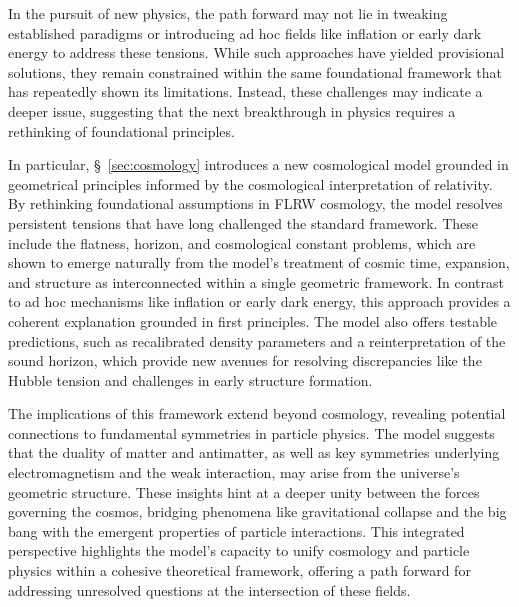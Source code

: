 \documentclass[aps,rmp,groupedaddress,twocolumn,10pt]{revtex4-2}
\begin{document}
In the pursuit of new physics, the path forward may not lie in tweaking established paradigms or introducing ad hoc fields like inflation or early dark energy \cite{Kamionkowski2023} to address these tensions. While such approaches have yielded provisional solutions, they remain constrained within the same foundational framework that has repeatedly shown its limitations. Instead, these challenges may indicate a deeper issue, suggesting that the next breakthrough in physics requires a rethinking of foundational principles.

In particular, \S~\ref{sec:cosmology} introduces a new cosmological model grounded in geometrical principles informed by the cosmological interpretation of relativity. By rethinking foundational assumptions in FLRW cosmology, the model resolves persistent tensions that have long challenged the standard framework. These include the flatness, horizon, and cosmological constant problems, which are shown to emerge naturally from the model's treatment of cosmic time, expansion, and structure as interconnected within a single geometric framework. In contrast to ad hoc mechanisms like inflation or early dark energy, this approach provides a coherent explanation grounded in first principles. The model also offers testable predictions, such as recalibrated density parameters and a reinterpretation of the sound horizon, which provide new avenues for resolving discrepancies like the Hubble tension and challenges in early structure formation.

The implications of this framework extend beyond cosmology, revealing potential connections to fundamental symmetries in particle physics. The model suggests that the duality of matter and antimatter, as well as key symmetries underlying electromagnetism and the weak interaction, may arise from the universe's geometric structure. These insights hint at a deeper unity between the forces governing the cosmos, bridging phenomena like gravitational collapse and the big bang with the emergent properties of particle interactions. This integrated perspective highlights the model's capacity to unify cosmology and particle physics within a cohesive theoretical framework, offering a path forward for addressing unresolved questions at the intersection of these fields.
\end{document}
